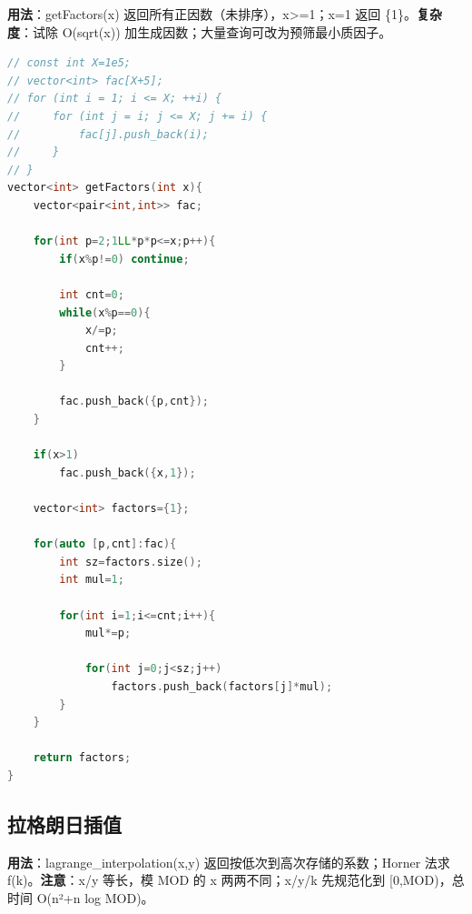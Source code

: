 \documentclass[a4paper,9pt]{extarticle}
\begin{document}
\textbf{用法}：getFactors(\allowbreak{}x) 返回所有正因数（未排序），x>\allowbreak{}=\allowbreak{}1；x=\allowbreak{}1 返回 \{1\}。\textbf{复杂度}：试除 O(sqrt(x)) 加生成因数；大量查询可改为预筛最小质因子。

\begin{lstlisting}[language={C++}]
// const int X=1e5;
// vector<int> fac[X+5];
// for (int i = 1; i <= X; ++i) {
//     for (int j = i; j <= X; j += i) {
//         fac[j].push_back(i);
//     }
// }
vector<int> getFactors(int x){
    vector<pair<int,int>> fac;

    for(int p=2;1LL*p*p<=x;p++){
        if(x%p!=0) continue;

        int cnt=0;
        while(x%p==0){
            x/=p;
            cnt++;
        }

        fac.push_back({p,cnt});
    }

    if(x>1)
        fac.push_back({x,1});

    vector<int> factors={1};

    for(auto [p,cnt]:fac){
        int sz=factors.size();
        int mul=1;

        for(int i=1;i<=cnt;i++){
            mul*=p;

            for(int j=0;j<sz;j++)
                factors.push_back(factors[j]*mul);
        }
    }

    return factors;
}

\end{lstlisting}
\subsection{拉格朗日插值}

\textbf{用法}：lagrange\_\allowbreak{}interpolation(\allowbreak{}x,\allowbreak{}y) 返回按低次到高次存储的系数；Horner 法求 f(k)。\textbf{注意}：x/\allowbreak{}y 等长，模 MOD 的 x 两两不同；x/\allowbreak{}y/\allowbreak{}k 先规范化到 [0,MOD)，总时间 O(n²+n log MOD)。
\end{document}
